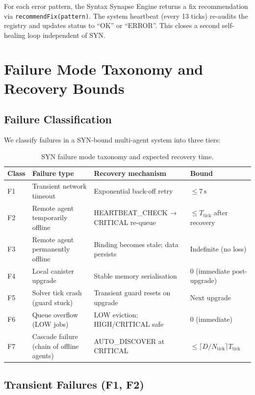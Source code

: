 \documentclass[12pt]{article}
\begin{document}
For each error pattern, the Syntax Synapse Engine returns a fix recommendation
via \texttt{recommendFix(pattern)}.  The system heartbeat (every 13 ticks)
re-audits the registry and updates status to ``OK'' or ``ERROR''.  This closes
a second self-healing loop independent of SYN.

\section{Failure Mode Taxonomy and Recovery Bounds}
\label{sec:failures}

\subsection{Failure Classification}

We classify failures in a SYN-bound multi-agent system into three tiers:

\begin{table}[h]
  \centering
  \caption{SYN failure mode taxonomy and expected recovery time.}
  \label{tab:failures}
  \begin{tabular}{lllp{4cm}}
    \toprule
    Class & Failure type & Recovery mechanism & Bound \\
    \midrule
    F1 & Transient network timeout & Exponential back-off retry & $\le 7\,\text{s}$ \\
    F2 & Remote agent temporarily offline & HEARTBEAT\_CHECK → CRITICAL re-queue & $\le T_\text{tick}$ after recovery \\
    F3 & Remote agent permanently offline & Binding becomes stale; data persists & Indefinite (no loss) \\
    F4 & Local canister upgrade & Stable memory serialisation & $0$ (immediate post-upgrade) \\
    F5 & Solver tick crash (guard stuck) & Transient guard resets on upgrade & Next upgrade \\
    F6 & Queue overflow (LOW jobs) & LOW eviction; HIGH/CRITICAL safe & $0$ (immediate) \\
    F7 & Cascade failure (chain of offline agents) & AUTO\_DISCOVER at CRITICAL & $\le \lceil D/N_\text{tick}\rceil T_\text{tick}$ \\
    \bottomrule
  \end{tabular}
\end{table}

\subsection{Transient Failures (F1, F2)}
\end{document}
